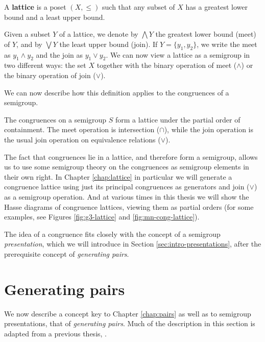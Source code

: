 \begin{definition}
  \label{def:lattice}
  A \textbf{lattice} is a poset $(X, \leq)$ such that any subset of $X$ has
  a greatest lower bound and a least upper bound.
\end{definition}

Given a subset $Y$ of a lattice, we denote by $\bigwedge Y$ the greatest lower
bound (meet) of $Y$, and by $\bigvee Y$ the least upper bound (join).  If
$Y = \{y_1, y_2\}$, we write the meet as $y_1 \wedge y_2$ and the join as
$y_1 \vee y_2$.  We can now view a lattice as a semigroup in two different ways:
the set $X$ together with the binary operation of meet ($\wedge$) or the binary
operation of join ($\vee$).

We can now describe how this definition applies to the congruences of a
semigroup.

\begin{proposition}
  \label{prop:cong-lattice}
  The congruences on a semigroup $S$ form a lattice under the partial order of
  containment.  The meet operation is intersection ($\cap$), while the join
  operation is the usual join operation on equivalence relations ($\vee$).
\end{proposition}

The fact that congruences lie in a lattice, and therefore form a semigroup,
allows us to use some semigroup theory on the congruences as semigroup elements
in their own right.  In Chapter \ref{chap:lattice} in particular we will
generate a congruence lattice using just its principal congruences as generators
and join ($\vee$) as a semigroup operation.  And at various times in this thesis
we will show the Hasse diagrams of congruence lattices, viewing them as partial
orders (for some examples, see Figures \ref{fig:g3-lattice} and
\ref{fig:mn-cong-lattice}).

The idea of a congruence fits closely with the concept of a semigroup
\textit{presentation}, which we will introduce in Section
\ref{sec:intro-presentations}, after the prerequisite concept of
\textit{generating pairs}.

\section{Generating pairs}
\label{sec:intro-gen-pairs}

We now describe a concept key to Chapter \ref{chap:pairs} as well as to
semigroup presentations, that of \textit{generating pairs}.  Much of the
description in this section is adapted from a previous thesis,
\cite{mtorpey_msc}.

